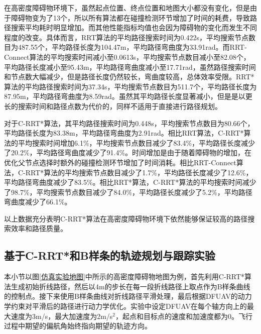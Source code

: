 在高密度障碍物环境下，虽然起点位置、终点位置和地图大小都没有变化，但是由于障碍物变为了13个，所以所有算法都在碰撞检测环节增加了时间的耗费，导致路径搜索平均耗时明显增加。而其他性能指标均值也会因为障碍物的变化而发生不同程度的改变。具体而言，RRT算法的平均路径搜索时间为0.422s，平均搜索节点数目为487.55个，平均路径长度为104.47m，平均路径弯曲度为33.91rad。而RRT-Connect算法的平均搜索时间减小至0.0613s，平均搜索节点数目减小至82.08个，平均路径长度减小至95.43m，平均路径弯曲度减小至17.71rad，虽然路径搜索时间和节点数大幅减少，但是路径长度仍然较长，弯曲度较高，总体效率受限。RRT*算法的平均路径搜索时间为37.34s，平均搜索节点数目为511.7个，平均路径长度为87.95m，平均路径弯曲度为8.59rad。虽然其平均路径长度显著减小，但是是以更长的搜索时间和路径点数为代价的，同样不适用于直接进行路径规划。

对于C-RRT*算法，其平均路径搜索时间为0.448s，平均搜索节点数目为80.66个，平均路径长度为83.38m，平均路径弯曲度为2.91rad。相比RRT算法，C-RRT*算法的平均搜索时间增加6.1\%，平均搜索节点数目减少了83.4\%，平均路径长度减少了20.2\%，平均路径弯曲度减少了91.4\%。时间增加是由于随着障碍物的增加，在优化父节点选择时额外的碰撞检测环节增加了时间消耗。相比RRT-Connect算法，C-RRT*算法的平均搜索节点数目减少了1.7\%，平均路径长度减少了12.6\%，平均路径弯曲度减少了83.5\%。相比RRT*算法，C-RRT*算法的平均搜索时间减少了98.7\%，平均搜索节点数目减少了84.0\%，平均路径长度减少了5.2\%，平均路径弯曲度减少了66.1\%。

以上数据充分表明C-RRT*算法在高密度障碍物环境下依然能够保证较高的路径搜索效率和路径质量。

\subsection{基于C-RRT*和B样条的轨迹规划与跟踪实验}

本小节以图\ref{仿真实验地图}中所示的高密度障碍物地图为例，首先利用C-RRT*算法生成初始折线路径，然后以4m的步长在每一段折线路径上取点作为B样条曲线的控制点。接下来使用B样条曲线对折线路径平滑处理，最后根据DFUAV的动力学约束对平滑后的路径进行动力学优化。实验中设定DFUAV在每个轴方向上的最大速度为3m/s，最大加速度为2m/s$^2$，起点和目标点的速度和加速度都为0。飞行过程中期望的偏航角始终指向期望的轨迹方向。

